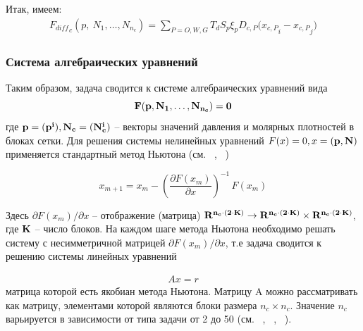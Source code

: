 \documentclass[12pt,a4paper]{article}
\begin{document}
Итак, имеем:
\begin{eqnarray}
  {F_{diff}}_c ( p, \ N_1, \dots ,  N_{n_c} ) =\sum\limits_{P = O, W, G}{T_dS_p\xi_pD_{c,P}({x_{c,P}}_i - {x_{c,P}}_j})
\end{eqnarray}
\newpage
\subsubsection{Система алгебраических уравнений}
Таким образом, задача сводится к системе алгебраических уравнений вида 
\begin{equation}
\bf F (\bf p, \bf N_1, \dots , \bf N_{n_c} ) = 0
\end{equation}
где $\bf p = (p^i), \bf N_c = (N_c^i)$ -- векторы значений давления и молярных плотностей в блоках сетки. Для решения системы нелинейных уравнений $F(x) = 0, x = (\bf p, \bf N)$ применяется стандартный метод Ньютона (см. ~\cite{Aziz}, ~\cite{Chen})

\begin{equation}
x_{m+1} = x_m - (\frac{\partial F(x_m)}{\partial x})^{-1}\,F(x_m)
\end{equation}

Здесь $\partial F (x_m) / \partial x$ -- отображение (матрица) 
$\bf R ^ {n_c \cdot (2 \cdot K)} \rightarrow \bf R ^ {n_c \cdot (2 \cdot K)} \times \bf R ^ {n_c \cdot (2 \cdot K)}$, где 
$\bf K$ -- число блоков. На каждом шаге метода Ньютона необходимо решать систему с несимметричной матрицей 
$\partial F (x_m) / \partial x$, т.е задача сводится к решению системы линейных уравнений 

\begin{eqnarray}
\label{DP_SLU}
Ax = r
\end{eqnarray}
матрица которой есть якобиан метода Ньютона. Матрицу A можно рассматривать как матрицу, элементами которой являются блоки размера 
$n_c \times n_c$. Значение $n_c$ варьируется в зависимости от типа задачи от 2 до 50 (см. ~\cite{Chen}, ~\cite{Aziz}, ~\cite{BogachevJabitskii-ILU}).
\\ \\
\end{document}
